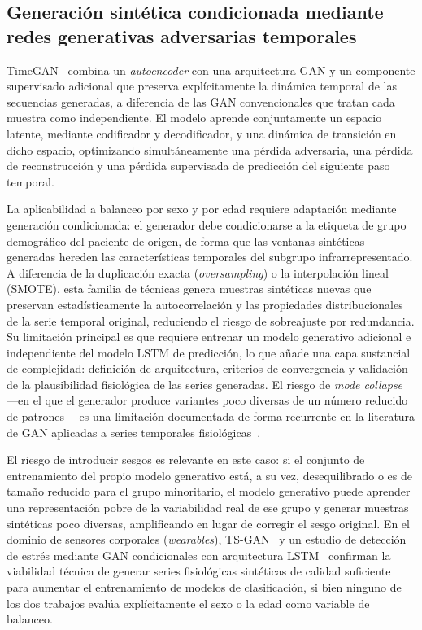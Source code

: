 \subsection{Generación sintética condicionada mediante redes generativas adversarias temporales}
\label{subsec:timegan_demografico}

TimeGAN~\cite{yoon2019timegan} combina un \emph{autoencoder} con una arquitectura GAN y un componente supervisado adicional que preserva explícitamente la dinámica temporal de las secuencias generadas, a diferencia de las GAN convencionales que tratan cada muestra como independiente. El modelo aprende conjuntamente un espacio latente, mediante codificador y decodificador, y una dinámica de transición en dicho espacio, optimizando simultáneamente una pérdida adversaria, una pérdida de reconstrucción y una pérdida supervisada de predicción del siguiente paso temporal.

La aplicabilidad a balanceo por sexo y por edad requiere adaptación mediante generación condicionada: el generador debe condicionarse a la etiqueta de grupo demográfico del paciente de origen, de forma que las ventanas sintéticas generadas hereden las características temporales del subgrupo infrarrepresentado. A diferencia de la duplicación exacta (\emph{oversampling}) o la interpolación lineal (SMOTE), esta familia de técnicas genera muestras sintéticas nuevas que preservan estadísticamente la autocorrelación y las propiedades distribucionales de la serie temporal original, reduciendo el riesgo de sobreajuste por redundancia. Su limitación principal es que requiere entrenar un modelo generativo adicional e independiente del modelo LSTM de predicción, lo que añade una capa sustancial de complejidad: definición de arquitectura, criterios de convergencia y validación de la plausibilidad fisiológica de las series generadas. El riesgo de \emph{mode collapse} —en el que el generador produce variantes poco diversas de un número reducido de patrones— es una limitación documentada de forma recurrente en la literatura de GAN aplicadas a series temporales fisiológicas~\cite{dong2023tsgan,dahmen2022conditionalgan}.

El riesgo de introducir sesgos es relevante en este caso: si el conjunto de entrenamiento del propio modelo generativo está, a su vez, desequilibrado o es de tamaño reducido para el grupo minoritario, el modelo generativo puede aprender una representación pobre de la variabilidad real de ese grupo y generar muestras sintéticas poco diversas, amplificando en lugar de corregir el sesgo original. En el dominio de sensores corporales (\emph{wearables}), TS-GAN~\cite{dong2023tsgan} y un estudio de detección de estrés mediante GAN condicionales con arquitectura LSTM~\cite{dahmen2022conditionalgan} confirman la viabilidad técnica de generar series fisiológicas sintéticas de calidad suficiente para aumentar el entrenamiento de modelos de clasificación, si bien ninguno de los dos trabajos evalúa explícitamente el sexo o la edad como variable de balanceo.

